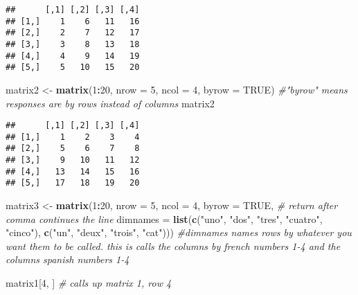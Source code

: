 \documentclass[]{article}
\newenvironment{Shaded}{\begin{snugshade}}{\end{snugshade}}
\newcommand{\KeywordTok}[1]{\textcolor[rgb]{0.13,0.29,0.53}{\textbf{#1}}}
\newcommand{\DataTypeTok}[1]{\textcolor[rgb]{0.13,0.29,0.53}{#1}}
\newcommand{\DecValTok}[1]{\textcolor[rgb]{0.00,0.00,0.81}{#1}}
\newcommand{\StringTok}[1]{\textcolor[rgb]{0.31,0.60,0.02}{#1}}
\newcommand{\CommentTok}[1]{\textcolor[rgb]{0.56,0.35,0.01}{\textit{#1}}}
\newcommand{\OtherTok}[1]{\textcolor[rgb]{0.56,0.35,0.01}{#1}}
\newcommand{\OperatorTok}[1]{\textcolor[rgb]{0.81,0.36,0.00}{\textbf{#1}}}
\newcommand{\NormalTok}[1]{#1}
\begin{document}
\begin{verbatim}
##      [,1] [,2] [,3] [,4]
## [1,]    1    6   11   16
## [2,]    2    7   12   17
## [3,]    3    8   13   18
## [4,]    4    9   14   19
## [5,]    5   10   15   20
\end{verbatim}

\begin{Shaded}
\begin{Highlighting}[]
\NormalTok{matrix2 <-}\StringTok{ }\KeywordTok{matrix}\NormalTok{(}\DecValTok{1}\OperatorTok{:}\DecValTok{20}\NormalTok{, }\DataTypeTok{nrow =} \DecValTok{5}\NormalTok{, }\DataTypeTok{ncol =} \DecValTok{4}\NormalTok{, }\DataTypeTok{byrow =} \OtherTok{TRUE}\NormalTok{) }\CommentTok{#"byrow" means responses are by rows instead of columns}
\NormalTok{matrix2}
\end{Highlighting}
\end{Shaded}

\begin{verbatim}
##      [,1] [,2] [,3] [,4]
## [1,]    1    2    3    4
## [2,]    5    6    7    8
## [3,]    9   10   11   12
## [4,]   13   14   15   16
## [5,]   17   18   19   20
\end{verbatim}

\begin{Shaded}
\begin{Highlighting}[]
\NormalTok{matrix3 <-}\StringTok{ }\KeywordTok{matrix}\NormalTok{(}\DecValTok{1}\OperatorTok{:}\DecValTok{20}\NormalTok{, }\DataTypeTok{nrow =} \DecValTok{5}\NormalTok{, }\DataTypeTok{ncol =} \DecValTok{4}\NormalTok{, }\DataTypeTok{byrow =} \OtherTok{TRUE}\NormalTok{, }\CommentTok{# return after comma continues the line}
                  \DataTypeTok{dimnames =} \KeywordTok{list}\NormalTok{(}\KeywordTok{c}\NormalTok{(}\StringTok{"uno"}\NormalTok{, }\StringTok{"dos"}\NormalTok{, }\StringTok{"tres"}\NormalTok{, }\StringTok{"cuatro"}\NormalTok{, }\StringTok{"cinco"}\NormalTok{), }
                                  \KeywordTok{c}\NormalTok{(}\StringTok{"un"}\NormalTok{, }\StringTok{"deux"}\NormalTok{, }\StringTok{"trois"}\NormalTok{, }\StringTok{"cat"}\NormalTok{))) }\CommentTok{#dimnames names rows by whatever you want them to be called. this is calls the columns by french numbers 1-4 and the columns spanish numbers 1-4 }

\NormalTok{matrix1[}\DecValTok{4}\NormalTok{, ] }\CommentTok{# calls up matrix 1, row 4}
\end{Highlighting}
\end{Shaded}
\end{document}
